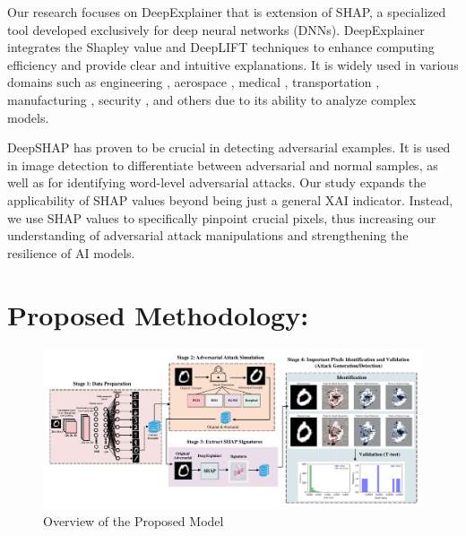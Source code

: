 \documentclass[10pt, conference, a4paper, final]{IEEEtran}
\begin{document}
Our research focuses on DeepExplainer \cite{LundbergandS} that is extension of SHAP, a specialized tool developed exclusively for deep neural networks (DNNs). DeepExplainer integrates the Shapley value and DeepLIFT techniques to enhance computing efficiency and provide clear and intuitive explanations. It is widely used in various domains such as engineering \cite{Mangalathu}, aerospace \cite{Aouf}, medical \cite{Singh},  transportation \cite{Parsa}, manufacturing \cite{Huang}, security \cite{Warnecke}, and others due to its ability to analyze complex models. 

DeepSHAP has proven to be crucial in detecting adversarial examples. It is used in image detection to differentiate between adversarial and normal samples, as well as for identifying word-level adversarial attacks. Our study expands the applicability of SHAP values beyond being just a general XAI indicator. Instead, we use SHAP values to specifically pinpoint crucial pixels, thus increasing our understanding of adversarial attack manipulations and strengthening the resilience of AI models.




\section{Proposed Methodology:}

\begin{figure}[!ht]
    \centering
    \includegraphics[width=1\textwidth]{paper_images/model.pdf}
    \caption{Overview of the Proposed Model}
    \label{overview}
\end{figure}
   
\end{document}
